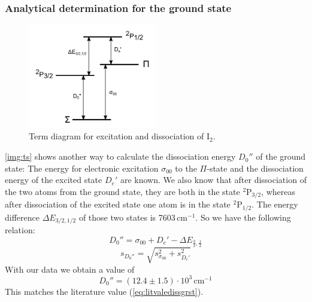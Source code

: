 \subsubsection{Analytical determination for the ground state}

\begin{figure}[H]
\begin{center}
  \includegraphics[width=0.5\textwidth]{../img/termschema.pdf}
  \caption[---]{Term diagram for excitation and dissociation of I$_2$.}
  \label{img:ts}
\end{center}
\end{figure}

\autoref{img:ts} shows another way to calculate the dissociation energy $D_0''$ of the ground state:
The energy for electronic excitation $\sigma_{00}$ to the $\Pi$-state and the dissociation energy of the
excited state $D_e'$ are known. We also know that after dissociation of the two atoms from
the ground state, they are both in the state ${}^2\text{P}_{3/2}$,
whereas after dissociation of the excited state one atom is in the state ${}^2\text{P}_{1/2}$.
The energy difference $\Delta E_{3/2,1/2}$ of those two states is 7603\,cm${}^{-1}$.
So we have the following relation:
\begin{equation}
  D_0''=\sigma_{00}+D_e'-\Delta E_{\frac{3}{2},\frac{1}{2}}
\end{equation}
\begin{equation}
  s_{D_0''}=\sqrt{s_{\sigma_{00}}^2+s_{D_e'}^2}
\end{equation}
With our data we obtain a value of
\begin{equation}
  D_0''=(12.4 \pm 1.5) \cdot 10^3 \, \text{cm}^{-1}
\end{equation}
This matches the literature value (\autoref{eq:litvaledissgrst}).
